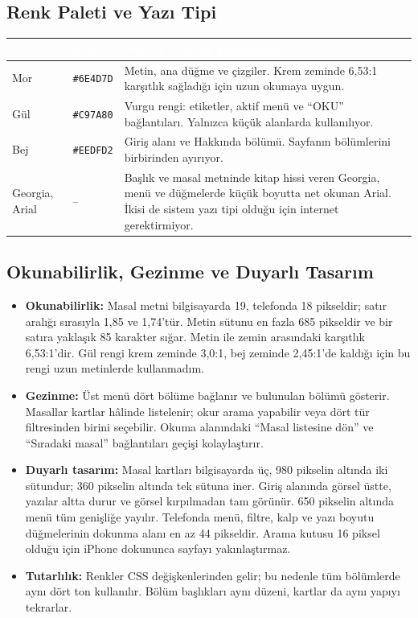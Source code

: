 \documentclass[12pt,a4paper]{article}
\begin{document}
\subsection{Renk Paleti ve Yazı Tipi}
\begin{center}
\begin{tabular}{@{}llp{6.4cm}@{}}
\toprule
\rowcolor{ana}\textcolor{white}{\textbf{Ad}} & \textcolor{white}{\textbf{Kod}} & \textcolor{white}{\textbf{Nerede / neden kullandınız?}} \\
\midrule
\relax Mor & \texttt{\#6E4D7D} & Metin, ana düğme ve çizgiler. Krem zeminde 6,53:1 karşıtlık sağladığı için uzun okumaya uygun. \\
\relax Gül & \texttt{\#C97A80} & Vurgu rengi: etiketler, aktif menü ve ``OKU'' bağlantıları. Yalnızca küçük alanlarda kullanılıyor. \\
\relax Bej & \texttt{\#EEDFD2} & Giriş alanı ve Hakkında bölümü. Sayfanın bölümlerini birbirinden ayırıyor. \\
\relax Georgia, Arial & -- & Başlık ve masal metninde kitap hissi veren Georgia, menü ve düğmelerde küçük boyutta net okunan Arial. İkisi de sistem yazı tipi olduğu için internet gerektirmiyor. \\
\bottomrule
\end{tabular}
\end{center}

\subsection{Okunabilirlik, Gezinme ve Duyarlı Tasarım}
\begin{itemize}
  \item \textbf{Okunabilirlik:} Masal metni bilgisayarda 19, telefonda 18 pikseldir; satır aralığı sırasıyla 1,85 ve 1,74'tür. Metin sütunu en fazla 685 pikseldir ve bir satıra yaklaşık 85 karakter sığar. Metin ile zemin arasındaki karşıtlık 6,53:1'dir. Gül rengi krem zeminde 3,0:1, bej zeminde 2,45:1'de kaldığı için bu rengi uzun metinlerde kullanmadım.
  \item \textbf{Gezinme:} Üst menü dört bölüme bağlanır ve bulunulan bölümü gösterir. Masallar kartlar hâlinde listelenir; okur arama yapabilir veya dört tür filtresinden birini seçebilir. Okuma alanındaki ``Masal listesine dön'' ve ``Sıradaki masal'' bağlantıları geçişi kolaylaştırır.
  \item \textbf{Duyarlı tasarım:} Masal kartları bilgisayarda üç, 980 pikselin altında iki sütundur; 360 pikselin altında tek sütuna iner. Giriş alanında görsel üstte, yazılar altta durur ve görsel kırpılmadan tam görünür. 650 pikselin altında menü tüm genişliğe yayılır. Telefonda menü, filtre, kalp ve yazı boyutu düğmelerinin dokunma alanı en az 44 pikseldir. Arama kutusu 16 piksel olduğu için iPhone dokununca sayfayı yakınlaştırmaz.
  \item \textbf{Tutarlılık:} Renkler CSS değişkenlerinden gelir; bu nedenle tüm bölümlerde aynı dört ton kullanılır. Bölüm başlıkları aynı düzeni, kartlar da aynı yapıyı tekrarlar.
\end{itemize}
\end{document}
